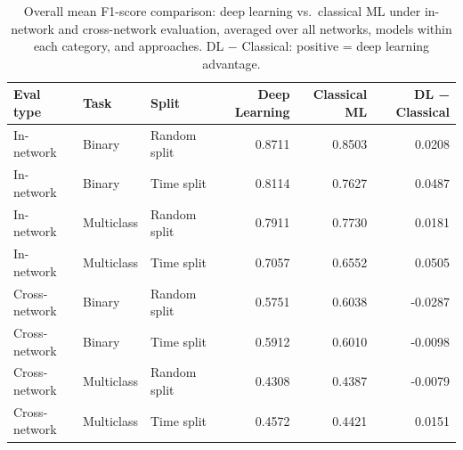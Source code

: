 \begin{table}
\caption{Overall mean F1-score comparison: deep learning vs.\ classical ML under in-network and cross-network evaluation, averaged over all networks, models within each category, and approaches. DL $-$ Classical: positive = deep learning advantage.}
\label{tab:q5_overall}
\begin{tabular}{lllrrr}
\toprule
Eval type & Task & Split & Deep Learning & Classical ML & DL − Classical \\
\midrule
In-network & Binary & Random split & 0.8711 & 0.8503 & 0.0208 \\
In-network & Binary & Time split & 0.8114 & 0.7627 & 0.0487 \\
In-network & Multiclass & Random split & 0.7911 & 0.7730 & 0.0181 \\
In-network & Multiclass & Time split & 0.7057 & 0.6552 & 0.0505 \\
Cross-network & Binary & Random split & 0.5751 & 0.6038 & -0.0287 \\
Cross-network & Binary & Time split & 0.5912 & 0.6010 & -0.0098 \\
Cross-network & Multiclass & Random split & 0.4308 & 0.4387 & -0.0079 \\
Cross-network & Multiclass & Time split & 0.4572 & 0.4421 & 0.0151 \\
\bottomrule
\end{tabular}
\end{table}
